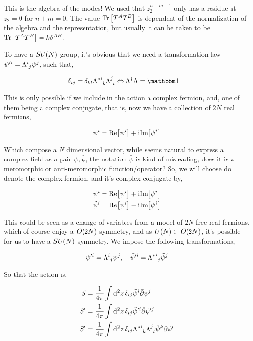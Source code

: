 This is the algebra of the modes! We used that $z_2^{n+m-1}$ only has a residue at $z_2=0$ for $n+m=0$. The value $\Tr\qty[T^A T^B]$ 
is dependent of the normalization of the algebra and the representation, but usually it can be taken to be $\Tr\qty[T^A T^B]=k\delta^{AB}$.

\probitem{}

To have a $SU\qty(N)$ group, it's obvious that we need a transformation law $\psi'^i=\tensor{\Lambda}{^i_ j}\psi^j$, such that, 

\begin{align*}
    \delta_{ij}&=\delta_{kl}\tensor{{\Lambda^\ast}}{^i_k}\tensor{\Lambda}{^j_l}\Leftrightarrow \Lambda^\dagger\Lambda=\mathbbm 1
\end{align*}

This is only possible if we include in the action a complex fermion, and, one of them being a complex conjugate, that is, now we have a collection of 
$2N$ real fermions,

\begin{align*}
    \psi^i=\textnormal{Re}\qty[\psi^i]+\textnormal{i} \textnormal{Im}\qty[\psi^i]
\end{align*}

Which compose a $N$ dimensional vector, while seems natural to express a complex field as a pair $\psi,\bar\psi$, 
the notation $\bar\psi$ is kind of misleading, does it is a meromorphic or anti-meromorphic function/operator? So, we will 
choose do denote the complex fermion, and it's complex conjugate by,

\begin{align*}
    \psi^i&=\textnormal{Re}\qty[\psi^i]+\textnormal{i} \textnormal{Im}\qty[\psi^i]\\
    {\tilde\psi}^i&=\textnormal{Re}\qty[\psi^i]-\textnormal{i} \textnormal{Im}\qty[\psi^i]
\end{align*}

This could be seen as a change of variables from a model of $2N$ free real fermions, which of course enjoy a $O\qty(2N)$ 
symmetry, and as $U\qty(N)\subset O\qty(2N)$, it's possible for us to have a $SU\qty(N)$ symmetry. We impose the 
following transformations,

\begin{align*}
    {\psi}'^i=\tensor{\Lambda}{^i_j}\psi^j,\ \ \ {\tilde\psi}'^i=\tensor{{\Lambda^\ast}}{^i_j}{\tilde \psi}^j
\end{align*}

So that the action is,

\begin{align*}
    S&=\frac{1}{4\pi}\int\dd[2]{z}\delta_{ij}{\tilde\psi}^i\bar\partial\psi^j\\
    S'&=\frac{1}{4\pi}\int\dd[2]{z}\delta_{ij}{\tilde\psi}'^i\bar\partial\psi'^j\\
    S'&=\frac{1}{4\pi}\int\dd[2]{z}\delta_{ij}\tensor{{\Lambda^\ast}}{^i_k}\tensor{\Lambda}{^j_l}{\tilde\psi}^k\bar\partial\psi^l
\end{align*}

